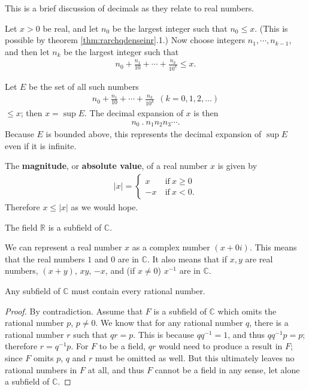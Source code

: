\documentclass[12pt]{article}
\begin{document}
\begin{comm}
  This is a brief discussion of decimals as they relate to real numbers.

  Let $x > 0$ be real, and let $n_0$ be the largest integer such that $n_0 \leq x$.
  (This is possible by theorem \ref{thm:rarchqdenseinr}.1.) Now choose integers
  $n_1,\cdots,n_{k-1}$, and then let $n_k$ be the largest integer such that
  \begin{align*}
    n_0 + \frac{n_1}{10} + \cdots + \frac{n_k}{10^k} \leq x.
  \end{align*}

  Let $E$ be the set of all such numbers
  \begin{align*}
    n_0 + \frac{n_1}{10} + \cdots + \frac{n_k}{10^k}\ \ (k = 0,1,2,\ldots)
  \end{align*}
  $\leq x$; then $x = \sup E$. The decimal expansion of $x$ is then
  \begin{align*}
    n_0\ .\ n_1n_2n_3\cdots.
  \end{align*}
  Because $E$ is bounded above, this represents the decimal expansion of $\sup E$
  even if it is infinite.
\end{comm}

\begin{defn}
  The \textbf{magnitude}, or \textbf{absolute value}, of a real number $x$ is given
  by
  \begin{align*}
    |x| =
    \begin{cases}
      x\ &\text{if}\ x \geq 0\\
      -x\ &\text{if}\ x < 0.
    \end{cases}
  \end{align*}
  Therefore $x \leq |x|$ as we would hope.
\end{defn}

\begin{exm}
  The field $\mathbb{R}$ is a subfield of $\mathbb{C}$.

  We can represent a real number $x$ as a complex number $(x +
  0i)$. This means that the real numbers $1$ and $0$ are in
  $\mathbb{C}$. It also means that if $x, y$ are real numbers,
  $(x + y)$, $xy$, $-x$, and (if $x \neq 0$) $x^{-1}$ are in
  $\mathbb{C}$.
\end{exm}

\begin{thm}
  Any subfield of $\mathbb{C}$ must contain every rational
  number.
  \begin{proof}
    By contradiction. Assume that $F$ is a subfield of
    $\mathbb{C}$ which omits the rational number $p$, $p \neq 0$.
    We know that for any rational number $q$, there is a rational
    number $r$ such that $qr = p$. This is because $qq^{-1} = 1$,
    and thus $qq^{-1}p = p$; therefore $r = q^{-1}p$. For $F$ to
    be a field, $qr$ would need to produce a result in $F$; since
    $F$ omits $p$, $q$ and $r$ must be omitted as well. But this
    ultimately leaves no rational numbers in $F$ at all, and thus
    $F$ cannot be a field in any sense, let alone a subfield of
    $\mathbb{C}$.
  \end{proof}
\end{thm}
\end{document}
